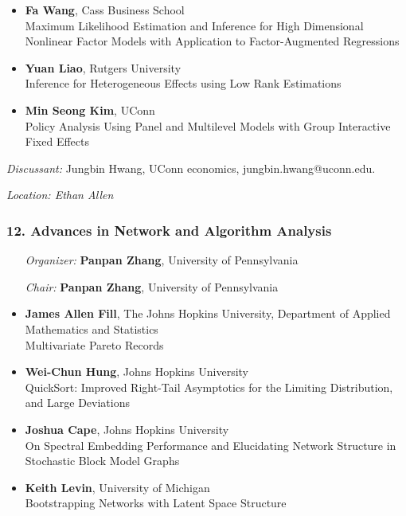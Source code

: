 \begin{itemize}
\item \textbf{Fa Wang}, Cass Business School \\
Maximum Likelihood Estimation and Inference for High Dimensional Nonlinear Factor Models with Application to Factor-Augmented Regressions
\item \textbf{Yuan Liao}, Rutgers University \\
Inference for Heterogeneous Effects using Low Rank Estimations
\item \textbf{Min Seong Kim}, UConn \\
Policy Analysis Using Panel and Multilevel Models with Group Interactive Fixed Effects
\end{itemize}

\emph{Discussant:} Jungbin Hwang, UConn economics, jungbin.hwang@uconn.edu.

\emph{Location: Ethan Allen}

\subsubsection*{12. Advances in Network and Algorithm Analysis}

\begin{enumerate}[align=left]
\item [\emph{Organizer:}] \textbf{Panpan Zhang}, University of Pennsylvania
\item [\emph{Chair:}] \textbf{Panpan Zhang}, University of Pennsylvania
\end{enumerate}

\begin{itemize}
\item \textbf{James Allen Fill}, The Johns Hopkins University, Department of Applied Mathematics and Statistics \\
Multivariate Pareto Records
\item \textbf{Wei-Chun Hung}, Johns Hopkins University \\
QuickSort: Improved Right-Tail Asymptotics for the Limiting Distribution, and Large Deviations
\item \textbf{Joshua Cape}, Johns Hopkins University \\
On Spectral Embedding Performance and Elucidating Network Structure in Stochastic Block Model Graphs
\item \textbf{Keith Levin}, University of Michigan \\
Bootstrapping Networks with Latent Space Structure
\end{itemize}

